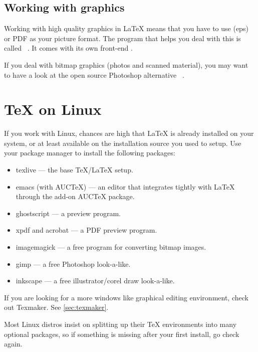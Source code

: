 \subsection{Working with graphics}

Working with high quality graphics in \LaTeX{} means that you have to use
\EPSi{} (eps) or PDF as your picture format. The program that helps you
deal with this is called ~\cite{ghostscript}. It comes with its
own front-end .

If you deal with bitmap graphics (photos and scanned material), you may want
to have a look at the open source Photoshop alternative ~\cite{gimp}.

\section{\TeX{} on Linux}

If you work with Linux, chances are high that \LaTeX{} is already installed
on your system, or at least available on the installation source you used to
setup. Use your package manager to install the following packages:

\begin{itemize}
  \item texlive --- the base \TeX{}/\LaTeX{} setup.
  \item emacs (with AUCTeX) --- an editor that integrates tightly with \LaTeX{} through the add-on AUCTeX package.
  \item ghostscript --- a \PSi{} preview program.
  \item xpdf and acrobat --- a PDF preview program.
  \item imagemagick --- a free program for converting bitmap images.
  \item gimp --- a free Photoshop look-a-like.
  \item inkscape --- a free illustrator/corel draw look-a-like.
\end{itemize}

If you are looking for a more windows like graphical editing environment,
check out Texmaker. See \autoref{sec:texmaker}.

Most Linux distros insist on splitting up their \TeX{} environments into many
optional packages, so if something is missing after your
first install, go check again.
